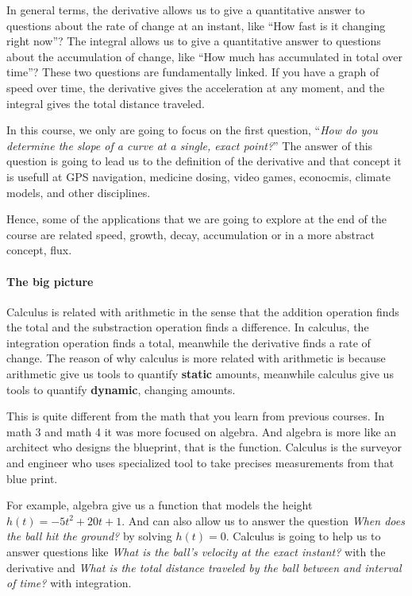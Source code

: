 \documentclass[../main-notes.tex]{subfile}
\begin{document}
In general terms, the derivative allows us to give a quantitative answer to questions about the rate of change at an instant, like ``How fast is it changing right now''?
The integral allows us to give a quantitative answer to questions about the accumulation of change, like ``How much has accumulated in total over time''?
These two questions are fundamentally linked. 
If you have a graph of speed over time, the derivative gives the acceleration at any moment, and the integral gives the total distance traveled.

In this course, we only are going to focus on the first question, ``\textit{How do you determine the slope of a curve at a single, exact point?}''
The answer of this question is going to lead us to the definition of the derivative and that concept it is usefull at GPS navigation, medicine dosing, video games, econocmis, climate models, and other disciplines.

Hence, some of the applications that we are going to explore at the end of the course are related speed, growth, decay, accumulation or in a more abstract concept, flux. 

\paragraph{The big picture}
Calculus is related with arithmetic in the sense that the addition operation finds the total and the substraction operation finds a difference.
In calculus, the integration operation finds a total, meanwhile the derivative finds a rate of change.
The reason of why calculus is more related with arithmetic is because arithmetic give us tools to quantify \textbf{static} amounts, meanwhile calculus give us tools to quantify \textbf{dynamic}, changing amounts.

This is quite different from the math that you learn from previous courses.
In math 3 and math 4 it was more focused on algebra.
And algebra is more like an architect who designs the blueprint, that is the function. 
Calculus is the surveyor and engineer who uses specialized tool to take precises measurements from that blue print.

For example, algebra give us a function that models the height $h(t) = -5t^2 + 20 t +1$.
And can also allow us to answer the question \emph{When does the ball hit the ground?} by solving $h(t) = 0$.
Calculus is going to help us to answer questions like \emph{What is the ball's velocity at the exact instant?} with the derivative and \emph{What is the total distance traveled by the ball between and interval of time?} with integration.
\end{document}
